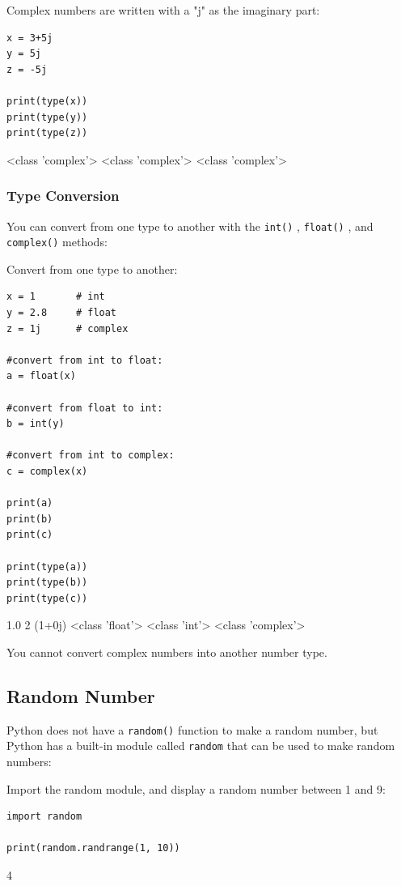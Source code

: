 \documentclass[12pt,a4paper]{article}
\newcommand{\code}[1]{%
	\colorbox{backcolour}{\lstinline{#1}}%
}
\begin{document}
Complex numbers are written with a "j" as the imaginary part:

\begin{ebox}
	\begin{lstlisting}
x = 3+5j
y = 5j
z = -5j

print(type(x))
print(type(y))
print(type(z))
	\end{lstlisting}
\tcblower
	\begin{vercode}
<class 'complex'>
<class 'complex'>
<class 'complex'>
	\end{vercode}
\end{ebox}
\subsubsection{Type Conversion}
You can convert from one type to another with the
\code{int()}, \code{float()},
and \code{complex()} methods:

\begin{ebox}
Convert from one type to another:
	\begin{lstlisting}
x = 1		# int
y = 2.8		# float
z = 1j		# complex

#convert from int to float:
a = float(x)

#convert from float to int:
b = int(y)

#convert from int to complex:
c = complex(x)

print(a)
print(b)
print(c)

print(type(a))
print(type(b))
print(type(c))
	\end{lstlisting}
\tcblower
	\begin{vercode}
1.0
2
(1+0j)
<class 'float'>
<class 'int'>
<class 'complex'>
	\end{vercode}
\end{ebox}

\begin{nbox}
You cannot convert complex numbers into another number type.
\end{nbox}
\subsection{Random Number}
Python does not have a \code{random()} function to make
a random number, but Python has a built-in module
called \code{random} that can be used to make random numbers:

\begin{ebox}
Import the random module,
and display a random number between 1 and 9:
	\begin{lstlisting}
import random

print(random.randrange(1, 10))
	\end{lstlisting}
\tcblower
	\begin{vercode}
4
	\end{vercode}
\end{ebox}
\end{document}
